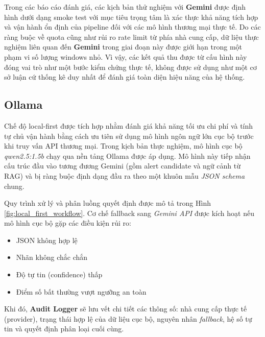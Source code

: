Trong các báo cáo đánh giá, các kịch bản thử nghiệm với \textbf{Gemini} được định hình dưới dạng smoke test với mục tiêu trọng tâm là xác thực khả năng tích hợp và vận hành ổn định của pipeline đối với các mô hình thương mại thực tế. Do các ràng buộc về quota cũng như rủi ro rate limit từ phía nhà cung cấp, dữ liệu thực nghiệm liên quan đến \textbf{Gemini} trong giai đoạn này được giới hạn trong một phạm vi số lượng windows nhỏ. Vì vậy, các kết quả thu được từ cấu hình này đóng vai trò như một bước kiểm chứng thực tế, không được sử dụng như một cơ sở luận cứ thống kê duy nhất để đánh giá toàn diện hiệu năng của hệ thống.

\subsection*{Ollama}
Chế độ local-first được tích hợp nhằm đánh giá khả năng tối ưu chi phí và tính tự chủ vận hành bằng cách ưu tiên sử dụng mô hình ngôn ngữ lớn cục bộ trước khi truy vấn API thương mại. Trong kịch bản thực nghiệm, mô hình cục bộ \textit{qwen2.5:1.5b} chạy qua nền tảng Ollama được áp dụng. Mô hình này tiếp nhận cấu trúc đầu vào tương đương Gemini (gồm alert candidate và ngữ cảnh từ RAG) và bị ràng buộc định dạng đầu ra theo một khuôn mẫu \textit{JSON schema} chung.

Quy trình xử lý và phân luồng quyết định được mô tả trong Hình \ref{fig:local_first_workflow}. Cơ chế fallback sang \textit{Gemini API} được kích hoạt nếu mô hình cục bộ gặp các điều kiện rủi ro: 
\begin{itemize}
    \item JSON không hợp lệ
    \item Nhãn không chắc chắn
    \item Độ tự tin (confidence) thấp
    \item Điểm số bất thường vượt ngưỡng an toàn
\end{itemize}
Khi đó, \textbf{Audit Logger} sẽ lưu vết chi tiết các thông số: nhà cung cấp thực tế (provider), trạng thái hợp lệ của dữ liệu cục bộ, nguyên nhân \textit{fallback}, hệ số tự tin và quyết định phân loại cuối cùng.

